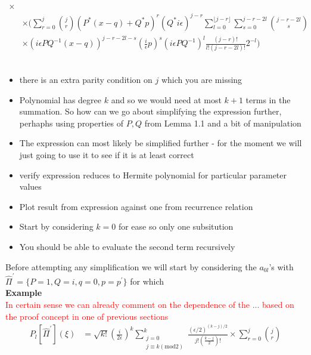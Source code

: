 \documentclass[12pt]{article}
\numberwithin{equation}{section}
\begin{document}
\begin{appendices}
\begin{equation}
\begin{split}
  \times
  \\
  &\times 
  \Bigg(
    \sum_{r=0}^j \binom{j}{r} \left( P^*(x-q) + Q^*p  \right)^r
    \left( Q^* i \epsilon \right)^{j-r}
    \sum_{l=0}^{\lfloor{j-r}\rfloor}\sum_{s=0}^{j - r - 2l}
    \binom{j-r-2l}{s} 
  \\
  &\times
    \left( i\epsilon PQ^{-1}(x - q)  \right)^{j - r -2l -s}
    \left( \frac{i}{\epsilon} p   \right)^s
    \left( i \epsilon PQ^{-1}   \right)^l \frac{(j-r)!}{l!(j - r - 2l)!}2^{-l}
  \Bigg)
  \end{split}
\end{equation}
\\
\begin{itemize}
  \item there is an extra parity condition on $j$ which you are missing
  \item Polynomial has degree $k$ and so we would need 
    at most $k + 1$ terms in the summation. So how can we go about 
    simplifying the expression further, perhaphs using properties 
    of $P,Q$ from Lemma 1.1 and a bit of manipulation
  \item The expression can most likely be simplified further - for 
    the moment we will just going to use it to see if it is at least 
    correct
  \item verify expression reduces to 
    Hermite polynomial for particular parameter values
  \item Plot result from expression against one from 
    recurrence relation 
  \item Start by considering $k = 0$ for ease so only one subsitution
  \item You should be able to evaluate the second term recursively
\end{itemize}
Before attempting any simplification we will start by considering the $a_{0l}$'s with
$\hat{\Pi}^\prime = \{P = 1, Q = i, q=0, p=p^\prime\}$ 
for which
\\
\textbf{Example}
\\
\textcolor{red}{In certain sense we can already comment on the 
dependence of the ... based on the proof concept in one of previous 
sections}
\begin{equation}
  \begin{split}
    P_{l}[\hat{\Pi}^\prime](\xi) &= 
    \sqrt{k!} \left( \frac{i}{2\epsilon} \right)^k
    \sum_{\substack{j=0 \\ j \equiv k (\text{mod} 2)}}^k \frac{(\epsilon/2)^{(k-j)/2}}{j! (\frac{k-j}{2})!}
    \times
      \sum_{r=0}^j \binom{j}{r} 

\end{split}
\end{equation}
\end{appendices}
\end{document}
